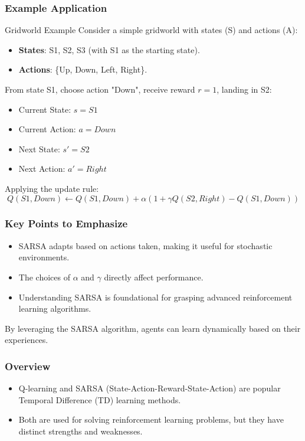 \documentclass[aspectratio=169]{beamer}
\begin{document}
\begin{frame}[fragile]
    \frametitle{Example Application}
    \begin{block}{Gridworld Example}
        Consider a simple gridworld with states (S) and actions (A):
        \begin{itemize}
            \item \textbf{States}: S1, S2, S3 (with S1 as the starting state).
            \item \textbf{Actions}: \{Up, Down, Left, Right\}.
        \end{itemize}
        
        From state S1, choose action "Down", receive reward \( r = 1 \), landing in S2:
        \begin{itemize}
            \item Current State: \( s = S1 \)
            \item Current Action: \( a = Down \)
            \item Next State: \( s' = S2 \)
            \item Next Action: \( a' = Right \)
        \end{itemize}

        Applying the update rule:
        \begin{equation}
            Q(S1, Down) \leftarrow Q(S1, Down) + \alpha \left( 1 + \gamma Q(S2, Right) - Q(S1, Down) \right)
        \end{equation}
    \end{block}
\end{frame}

\begin{frame}[fragile]
    \frametitle{Key Points to Emphasize}
    \begin{itemize}
        \item SARSA adapts based on actions taken, making it useful for stochastic environments.
        \item The choices of \( \alpha \) and \( \gamma \) directly affect performance.
        \item Understanding SARSA is foundational for grasping advanced reinforcement learning algorithms.
    \end{itemize}
    By leveraging the SARSA algorithm, agents can learn dynamically based on their experiences.
\end{frame}

\begin{frame}[fragile]
    \frametitle{Overview}
    \begin{itemize}
        \item Q-learning and SARSA (State-Action-Reward-State-Action) are popular Temporal Difference (TD) learning methods.
        \item Both are used for solving reinforcement learning problems, but they have distinct strengths and weaknesses.
    \end{itemize}
\end{frame}
\end{document}

